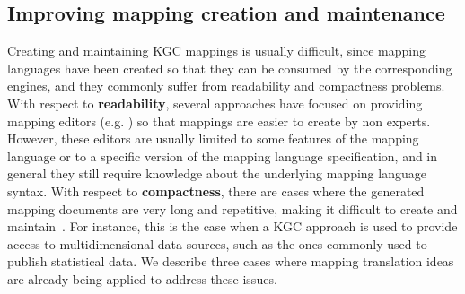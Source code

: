 \begin{table}[!ht]
\centering
\caption{Summary of Mapping Translation Approaches}
\label{tab:chap4_summary}
\end{table}



\subsection{Improving mapping creation and maintenance}

Creating and maintaining KGC mappings is usually difficult, since mapping languages have been created so that they can be consumed by the corresponding engines, and they commonly suffer from readability and compactness problems. With respect to \textbf{readability}, several approaches have focused on providing mapping editors (e.g. \citep{heyvaert2016rmleditor,iglesias2020mapeathor}) so that mappings are easier to create by non experts. However, these editors are usually limited to some features of the mapping language or to a specific version of the mapping language specification, and in general they still require knowledge about the underlying mapping language syntax. With respect to \textbf{compactness}, there are cases where the generated mapping documents are very long and repetitive, making it difficult to create and maintain~\citep{chaves2018virtual}. For instance, this is the case when a KGC approach is used to provide access to multidimensional data sources, such as the ones commonly used to publish statistical data. We describe three cases where mapping translation ideas are already being applied to address these issues. 

